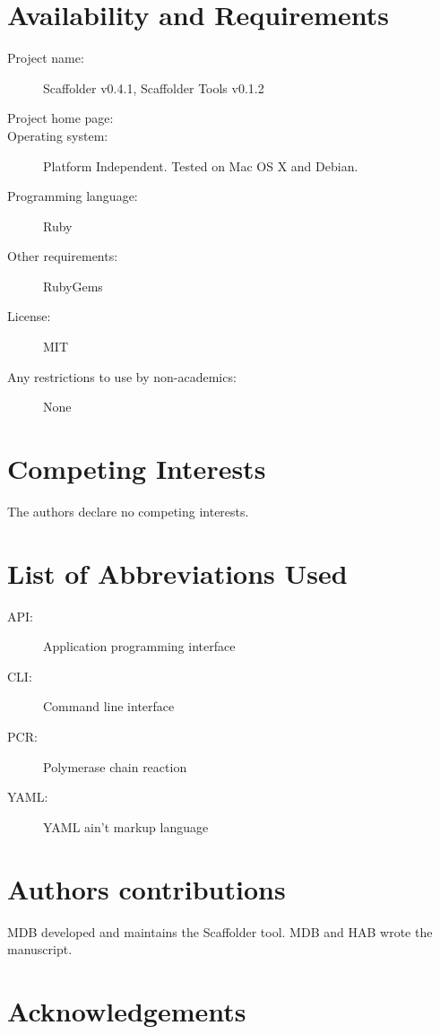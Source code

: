 \documentclass[10pt]{bmc_article}
\newenvironment{bmcformat}{\begin{raggedright}\baselineskip20pt\sloppy\setboolean{publ}{false}}{\end{raggedright}\baselineskip20pt\sloppy}
\begin{document}
\begin{bmcformat}
\clearpage

\section*{Availability and Requirements} %

  \begin{description}
    \item[Project name:] Scaffolder v0.4.1, Scaffolder Tools v0.1.2
    \item[Project home page:] \scaffolder
    \item[Operating system:] Platform Independent. Tested on Mac OS X and
    Debian.
    \item[Programming language:] Ruby
    \item[Other requirements:] RubyGems
    \item[License:] MIT
    \item[Any restrictions to use by non-academics:] None
  \end{description}

\clearpage

\section*{Competing Interests} %

The authors declare no competing interests.

\section*{List of Abbreviations Used} %

  \begin{description}
    \item[API:] Application programming interface
    \item[CLI:] Command line interface
    \item[PCR:] Polymerase chain reaction
    \item[YAML:] YAML ain't markup language\cite{yaml}
  \end{description}

\section*{Authors contributions} %

MDB developed and maintains the Scaffolder tool. MDB and HAB wrote the
manuscript.

\section*{Acknowledgements} %


\end{bmcformat}
\end{document}
